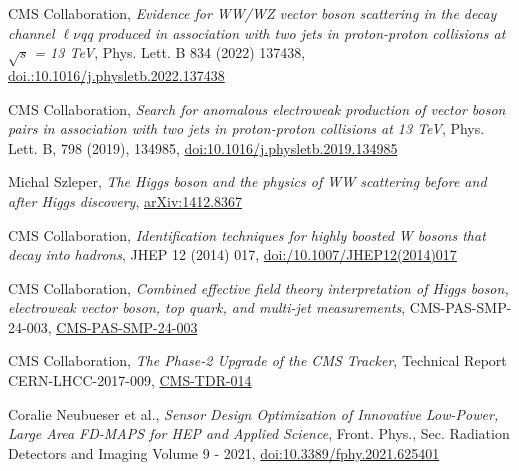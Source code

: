 {\begin{flushleft}
\end{flushleft}

\begin{thebibliography}{9}
\bibitem{[1]}
CMS Collaboration, {\em Evidence for WW/WZ vector boson scattering in the decay channel $\ell\nu$qq produced in association with two jets in proton-proton collisions at $\sqrt{s}$ = 13 TeV}, Phys. Lett. B 834 (2022) 137438, \href{https://doi.org/10.1016/j.physletb.2022.137438}{doi.:10.1016/j.physletb.2022.137438}

\bibitem{[2]}
CMS Collaboration, {\em Search for anomalous electroweak production of vector boson pairs in association with two jets in proton-proton collisions at 13 TeV}, Phys. Lett. B, 798 (2019), 134985, \href{https://doi.org/10.1016/j.physletb.2019.134985}{doi:10.1016/j.physletb.2019.134985}

\bibitem{[3]}
Michal Szleper, {\em The Higgs boson and the physics of WW scattering before and after Higgs discovery}, \href{https://arxiv.org/pdf/1412.8367}{arXiv:1412.8367}


\bibitem{[4]}
CMS Collaboration, {\em Identification techniques for highly boosted W bosons that decay into hadrons}, JHEP 12 (2014) 017, \href{https://link.springer.com/article/10.1007/JHEP12(2014)017}{doi:/10.1007/JHEP12(2014)017}

\bibitem{[5]}
CMS Collaboration, {\em Combined effective field theory interpretation of Higgs boson, electroweak vector boson, top quark, and multi-jet measurements}, CMS-PAS-SMP-24-003, \href{https://cds.cern.ch/record/2911229/}{CMS-PAS-SMP-24-003}

\bibitem{[6]}
CMS Collaboration, {\em The Phase-2 Upgrade of the CMS Tracker}, Technical Report CERN-LHCC-2017-009, \href{https://cds.cern.ch/record/2272264?ln=en}{CMS-TDR-014}

\bibitem{[7]}
Coralie Neubueser et al., {\em Sensor Design Optimization of Innovative Low-Power, Large Area FD-MAPS for HEP and Applied Science}, Front. Phys., Sec. Radiation Detectors and Imaging
Volume 9 - 2021, \href{https://doi.org/10.3389/fphy.2021.625401}{doi:10.3389/fphy.2021.625401}
\end{thebibliography}
}
